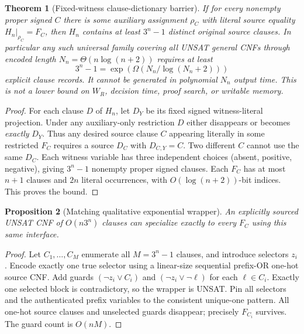\documentclass[11pt]{article}
\newtheorem{theorem}{Theorem}
\newtheorem{proposition}[theorem]{Proposition}
\begin{document}
\begin{theorem}[Fixed-witness clause-dictionary barrier]
If for every nonempty proper signed $C$ there is some auxiliary assignment $\rho_C$ with \emph{literal source equality} $H_n|_{\rho_C}=F_C$, then $H_n$ contains at least $3^n-1$ distinct original source clauses. In particular any such universal family covering all UNSAT general CNFs through encoded length $N_n=\Theta(n\log(n+2))$ requires at least
\[
3^n-1=\exp(\Omega(N_n/\log(N_n+2)))
\]
explicit clause records. It cannot be generated in polynomial $N_n$ output time. This is not a lower bound on $W_R$, decision time, proof search, or writable memory.
\end{theorem}
\begin{proof}
For each clause $D$ of $H_n$, let $D_Y$ be its fixed signed witness-literal projection. Under any auxiliary-only restriction $D$ either disappears or becomes \emph{exactly} $D_Y$. Thus any desired source clause $C$ appearing literally in some restricted $F_C$ requires a source $D_C$ with $D_{C,Y}=C$. Two different $C$ cannot use the same $D_C$. Each witness variable has three independent choices (absent, positive, negative), giving $3^n-1$ nonempty proper signed clauses. Each $F_C$ has at most $n+1$ clauses and $2n$ literal occurrences, with $O(\log(n+2))$-bit indices. This proves the bound.
\end{proof}
\begin{proposition}[Matching qualitative exponential wrapper]
An explicitly sourced UNSAT CNF of $O(n3^n)$ clauses can specialize exactly to every $F_C$ using this same interface.
\end{proposition}
\begin{proof}
Let $C_1,\ldots,C_M$ enumerate all $M=3^n-1$ clauses, and introduce selectors $z_i$. Encode exactly one true selector using a linear-size sequential prefix-OR one-hot source CNF. Add guards $(\neg z_i\vee C_i)$ and $(\neg z_i\vee\neg\ell)$ for each $\ell\in C_i$. Exactly one selected block is contradictory, so the wrapper is UNSAT. Pin all selectors and the authenticated prefix variables to the consistent unique-one pattern. All one-hot source clauses and unselected guards disappear; precisely $F_{C_i}$ survives. The guard count is $O(nM)$.
\end{proof}
\end{document}
